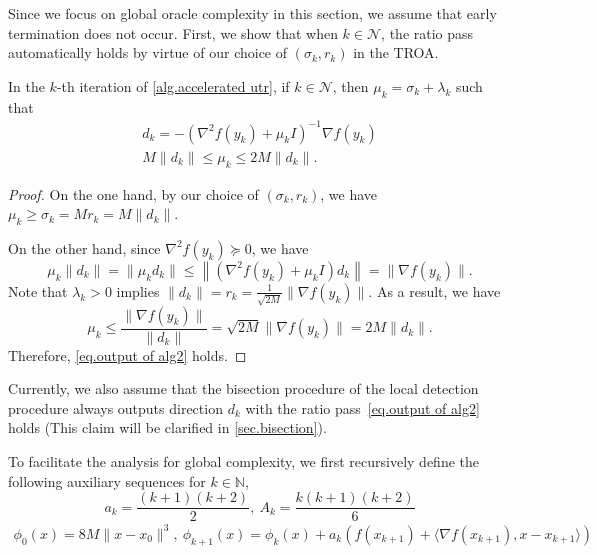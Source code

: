 \documentclass{article}
\begin{document}
Since we focus on global oracle complexity in this section, we assume that early termination does not occur. First, we show that when $k\in\mathcal{N}$, the ratio pass automatically holds by virtue of our choice of $(\sigma_k,r_k)$ in the TROA.
\begin{lemma}
    \label{lem.ratio pass nonzero}
    In the $k$-th iteration of \autoref{alg.accelerated utr}, if $k\in\mathcal{N}$, then $\mu_k=\sigma_k+\lambda_k$ such that
    \begin{subequations}
        \label{eq.output of alg2}
        \begin{gather}
            d_k = -\left(\nabla^2 f(y_k)+\mu_k I \right)^{-1}\nabla f(y_k)\\
            M\|d_k\|\leq \mu_k \leq 2M\|d_k\|.
        \end{gather}
    \end{subequations}
\end{lemma}
\begin{proof}
    On the one hand, by our choice of $(\sigma_k,r_k)$, we have $\mu_k\geq\sigma_k= Mr_k= M\|d_k\|$.

    On the other hand, since $\nabla^2 f(y_k)\succeq 0$, we have
    \begin{equation*}
        \mu_k\|d_k\|=\|\mu_kd_k\|\leq \left\|\left(\nabla^2 f(y_k)+\mu_k I\right)d_k\right\|=\|\nabla f(y_k)\|.
    \end{equation*}
    Note that $\lambda_k>0$ implies $\|d_k\|=r_k=\frac{1}{\sqrt{2M}}\|\nabla f(y_k)\|$. As a result, we have
    \begin{equation*}
        \mu_k\leq \frac{\|\nabla f(y_k)\|}{\|d_k\|}=\sqrt{2M}\|\nabla f(y_k)\|=2M\|d_k\|.
    \end{equation*}
    Therefore, \eqref{eq.output of alg2} holds.
\end{proof}
Currently, we also assume that the bisection procedure of the local detection procedure always outputs direction $d_k$ with the ratio pass~\eqref{eq.output of alg2} holds (This claim will be clarified in \autoref{sec.bisection}).

To facilitate the analysis for global complexity, we first recursively define the following auxiliary sequences for $k\in \mathbb{N}$,
\begin{equation}
    \label{eq.update a and A}
    a_k = \frac{(k+1)(k+2)}{2}, \ A_k=\frac{k(k+1)(k+2)}{6}
\end{equation}
\begin{align}\label{eq.update phi}
\phi_0(x) = 8M\|x-x_0\|^3, \ \phi_{k+1}(x) =\phi_k(x)+a_k\left (f(x_{k+1})+\langle \nabla f(x_{k+1}),x-x_{k+1}\rangle \right )
\end{align}
\end{document}
